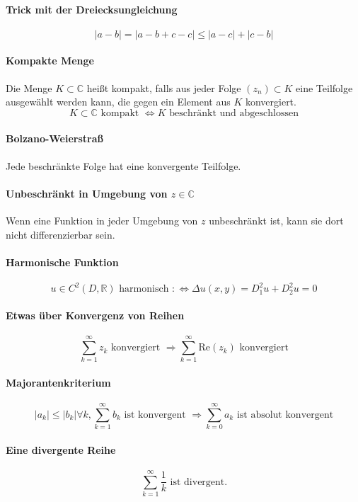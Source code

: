 \documentclass[a4paper, 10pt, DIV20, headings=small]{scrartcl}
\theoremstyle{definition}
\theoremstyle{plain}
\begin{document}
\paragraph{Trick mit der Dreiecksungleichung}
$$|a-b| = |a-b+c-c| \leq |a-c| + |c-b|$$

\paragraph{Kompakte Menge}
Die Menge $K \subset \mathbb{C}$ heißt kompakt, falls aus jeder Folge $(z_n) \subset K$ eine Teilfolge
ausgewählt werden kann, die gegen ein Element aus $K$ konvergiert.
$$K \subset \mathbb{C} \text{ kompakt } \Leftrightarrow K \text{ beschränkt und abgeschlossen}$$

\paragraph{Bolzano-Weierstraß}
Jede beschränkte Folge hat eine konvergente Teilfolge.

\paragraph{Unbeschränkt in Umgebung von $z \in \mathbb{C}$}
Wenn eine Funktion in jeder Umgebung von $z$ unbeschränkt ist, kann sie dort nicht differenzierbar sein.

\paragraph{Harmonische Funktion}
$$u \in C^2(D,\mathbb{R}) \text{ harmonisch } :\Leftrightarrow \Delta u(x,y) = D_1^2 u + D_2^2 u = 0$$

\paragraph{Etwas über Konvergenz von Reihen}
$$\sum\limits_{k=1}^\infty{z_k} \text{ konvergiert } \Rightarrow \sum\limits_{k=1}^\infty{\text{Re}(z_k)} \text{ konvergiert}$$

\paragraph{Majorantenkriterium}
$$|a_k| \leq |b_k| \forall k, \sum\limits_{k=1}^{\infty}{b_k} \text{ ist konvergent } \Rightarrow \sum\limits_{k=0}^\infty {a_k} \text{ ist absolut konvergent}$$

\paragraph{Eine divergente Reihe}
$$\sum\limits_{k=1}^\infty{\frac{1}{k}} \text{ ist divergent.}$$
\end{document}
